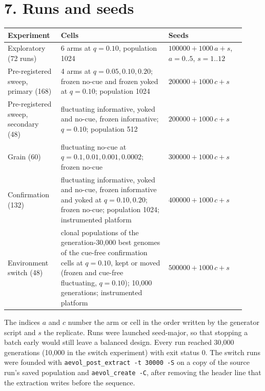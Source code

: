 \section*{7. Runs and seeds}
\begin{center}
\small
\begin{tabular}{@{}p{0.2\linewidth}p{0.42\linewidth}p{0.3\linewidth}@{}}
\toprule
Experiment & Cells & Seeds\\
\midrule
Exploratory (72 runs) & 6 arms at $q=0.10$, population 1024 & $100000 + 1000\,a + s$, $a=0..5$, $s=1..12$\\
Pre-registered sweep, primary (168) & 4 arms at $q=0.05, 0.10, 0.20$; frozen no-cue and frozen yoked at $q=0.10$; population 1024 & $200000 + 1000\,c + s$\\
Pre-registered sweep, secondary (48) & fluctuating informative, yoked and no-cue, frozen informative; $q=0.10$; population 512 & $200000 + 1000\,c + s$\\
Grain (60) & fluctuating no-cue at $q=0.1, 0.01, 0.001, 0.0002$; frozen no-cue & $300000 + 1000\,c + s$\\
Confirmation (132) & fluctuating informative, yoked and no-cue, frozen informative and yoked at $q=0.10, 0.20$; frozen no-cue; population 1024; instrumented platform & $400000 + 1000\,c + s$\\
Environment switch (48) & clonal populations of the generation-30{,}000 best genomes of the cue-free confirmation cells at $q=0.10$, kept or moved (frozen and cue-free fluctuating, $q=0.10$); 10{,}000 generations; instrumented platform & $500000 + 1000\,c + s$\\
\bottomrule
\end{tabular}
\end{center}
The indices $a$ and $c$ number the arm or cell in the order written by the generator
script and $s$ the replicate. Runs were launched seed-major, so that stopping a
batch early would still leave a balanced design. Every run reached 30{,}000
generations (10{,}000 in the switch experiment) with exit status 0. The switch
runs were founded with \texttt{aevol\_post\_extract -t 30000 -S} on a copy of
the source run's saved population and \texttt{aevol\_create -C}, after removing
the header line that the extraction writes before the sequence.

